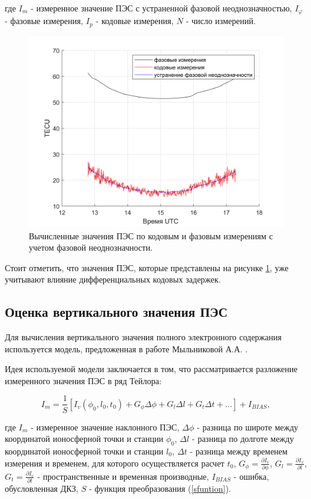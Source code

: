 \documentclass[a4paper]{article}
\begin{document}
где $I_m$ - измеренное значение ПЭС с устраненной фазовой неоднозначностью, $I_\varphi$ - фазовые измерения, $I_p$ - кодовые измерения, $N$ - число измерений.  

\begin{figure}[h!]
\centering
\includegraphics[width = 1\linewidth]{pics/clean_pics/stec.png}
\caption{Вычисленные значения ПЭС по кодовым и фазовым измерениям с учетом фазовой неоднозначности.}
\label{stecplot}
\end{figure}

Стоит отметить, что значения ПЭС, которые представлены на рисунке \ref{stecplot}, уже учитывают влияние дифференциальных кодовых задержек.

\clearpage
\newpage
\subsection{Оценка вертикального значения ПЭС}
Для вычисления вертикального значения полного электронного содержания используется модель, предложенная в работе Мыльниковой А.А. \cite{milnikova}.

Идея используемой модели заключается в том, что рассматривается разложение измеренного значения ПЭС в ряд Тейлора:

\begin{equation}
I_m = \frac{1}{S} \left[ I_v(\phi_0, l_0, t_0) + G_{\phi} \Delta\phi + G_l \Delta l + G_t \Delta t + ... \right] + I_{BIAS},
\label{taylor}
\end{equation}

где $I_m$ - измеренное значение наклонного ПЭС, $\Delta\phi$ - разница по широте между координатой ионосферной точки и станции $\phi_0$, $\Delta l$ - разница по долготе между координатой ионосферной точки и станции $l_0$, $\Delta t$ - разница между временем измерения и временем, для которого осуществляется расчет $t_0$, $G_{\phi} = \frac{\partial I_v}{\partial \phi}$, $G_l = \frac{\partial I_v}{\partial l}$, $G_t = \frac{\partial I_v}{\partial t}$ - пространственные и временная производные, $I_{BIAS}$ - ошибка, обусловленная ДКЗ, $S$ - функция преобразования (\ref{sfuntion}).
\end{document}
